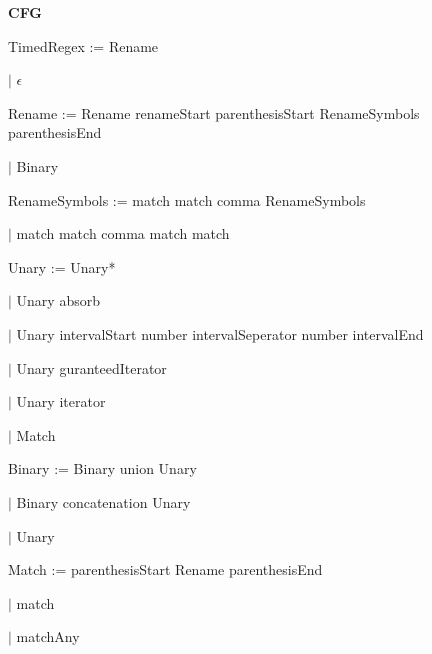 
\textbf{CFG}

TimedRegex := Rename

\qquad	$\mid$ $\epsilon$

Rename := Rename renameStart parenthesisStart RenameSymbols parenthesisEnd

\qquad $\mid$ Binary

RenameSymbols := match match comma RenameSymbols

\qquad $\mid$ match match comma match match

Unary := Unary*

\qquad $\mid$ Unary absorb

\qquad $\mid$ Unary intervalStart number intervalSeperator number intervalEnd

\qquad $\mid$ Unary guranteedIterator

\qquad $\mid$ Unary iterator

\qquad $\mid$ Match

Binary := Binary union Unary

\qquad $\mid$ Binary concatenation Unary

\qquad $\mid$ Unary

Match := parenthesisStart Rename parenthesisEnd

\qquad $\mid$ match

\qquad $\mid$ matchAny

